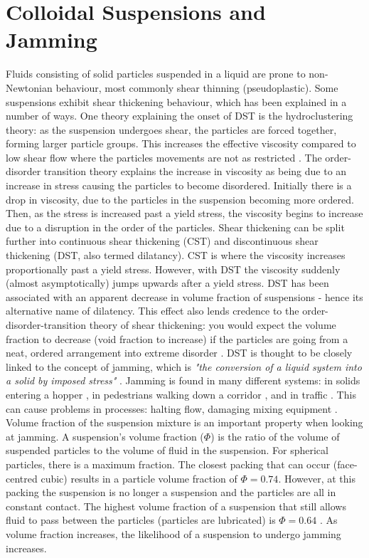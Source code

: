 \documentclass[twoside,a4]{report}
\def\br{\newline \newline \noindent}
\begin{document}
	\section{Colloidal Suspensions and Jamming} %
	Fluids consisting of solid particles suspended in a liquid are prone to non-Newtonian behaviour, most commonly shear thinning (pseudoplastic). Some suspensions exhibit shear thickening behaviour, which has been explained in a number of ways. One theory explaining the onset of DST is the hydroclustering theory: as the suspension undergoes shear, the particles are forced together, forming larger particle groups. This increases the effective viscosity compared to low shear flow where the particles movements are not as restricted \cite[p.~7]{backbrownjaegrev}. The order-disorder transition  theory explains the increase in viscosity as being due to an increase in stress causing the particles to become disordered. Initially there is a drop in viscosity, due to the particles in the suspension becoming more ordered. Then, as the stress is increased past a yield stress, the viscosity begins to increase due to a disruption in the order of the particles. %
	\br
	Shear thickening can be split further into continuous shear thickening (CST) and discontinuous shear thickening (DST, also termed dilatancy). CST is where the viscosity increases proportionally past a yield stress. However, with DST the viscosity suddenly (almost asymptotically) jumps upwards after a yield stress. DST has been associated with an apparent decrease in volume fraction of suspensions - hence its alternative name of dilatency. This effect also lends credence to the order-disorder-transition theory of shear thickening: you would expect the volume fraction to decrease (void fraction to increase) if the particles are going from a neat, ordered arrangement into extreme disorder \cite[p.~7]{backbrownjaegrev}. \br
	DST is thought to be closely linked to the concept of jamming, which is \textit{"the conversion of a liquid system into a solid by imposed stress"} \cite{backhawjam}. Jamming is found in many different systems: in solids entering a hopper \cite{back2djam}, in pedestrians walking down a corridor \cite{backpedjam}, and in traffic \cite{backcarjam}. This can cause problems in processes: halting flow, damaging mixing equipment \cite{backshearjambertrand}. \br 
	Volume fraction of the suspension mixture is an important property when looking at jamming. A suspension's volume fraction (\( \Phi \)) is the ratio of the volume of suspended particles to the volume of fluid in the suspension. For spherical particles, there is a maximum fraction. The closest packing that can occur (face-centred cubic) results in a particle volume fraction of \( \Phi = 0.74 \). However, at this packing the suspension is no longer a suspension and the particles are all in constant contact. The highest volume fraction of a suspension that still allows fluid to pass between the particles (particles are lubricated) is \( \Phi = 0.64 \) \cite{backguypoonjam}. As volume fraction increases, the likelihood of a suspension to undergo jamming increases. \br
\end{document}
